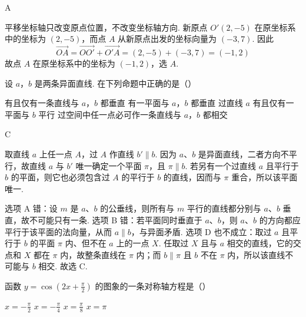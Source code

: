 \begin{answer}
A
\end{answer}

\begin{solution}
平移坐标轴只改变原点位置，不改变坐标轴方向. 新原点 \(O'(2,-5)\) 在原坐标系中的坐标为 \((2,-5)\)，而点 \(A\) 从新原点出发的坐标向量为 \((-3,7)\). 因此
\[
\overrightarrow{OA}=\overrightarrow{OO'}+\overrightarrow{O'A}=(2,-5)+(-3,7)=(-1,2)
\]
故点 \(A\) 在原坐标系中的坐标为 \((-1,2)\)，选 \(A\).
\end{solution}

\begin{problem}
设 \(a\)，\(b\) 是两条异面直线. 在下列命题中正确的是（\quad）

\choices
    {有且仅有一条直线与 \(a\)，\(b\) 都垂直}
    {有一平面与 \(a\)，\(b\) 都垂直}
    {过直线 \(a\) 有且仅有一平面与 \(b\) 平行}
    {过空间中任一点必可作一条直线与 \(a\)，\(b\) 都相交}
\end{problem}

\begin{answer}
C
\end{answer}

\begin{solution}
取直线 \(a\) 上任一点 \(A\)，过 \(A\) 作直线 \(b'\parallel b\). 因为 \(a\)、\(b\) 是异面直线，二者方向不平行，故直线 \(a\) 与 \(b'\) 唯一确定一个平面 \(\pi\)，且 \(\pi\parallel b\). 若另有一个过直线 \(a\) 且平行于 \(b\) 的平面，则它也必须包含过 \(A\) 的平行于 \(b\) 的直线，因而与 \(\pi\) 重合，所以该平面唯一.

选项 A 错：设 \(m\) 是 \(a\)、\(b\) 的公垂线，则所有与 \(m\) 平行的直线都分别与 \(a\)、\(b\) 垂直，故不可能只有一条. 选项 B 错：若平面同时垂直于 \(a\)、\(b\)，则 \(a\)、\(b\) 的方向都应平行于该平面的法向量，从而 \(a\parallel b\)，与异面矛盾. 选项 D 也不成立：取过 \(a\) 且平行于 \(b\) 的平面 \(\pi\) 内、但不在 \(a\) 上的一点 \(X\). 任取过 \(X\) 且与 \(a\) 相交的直线，它的交点和 \(X\) 都在 \(\pi\) 内，故整条直线在 \(\pi\) 内；而 \(b\parallel\pi\) 且 \(b\) 不在 \(\pi\) 内，所以该直线不可能与 \(b\) 相交. 故选 C.
\end{solution}

\begin{problem}
函数 \(y = \cos \left(2x + \frac{\pi}{2}\right) \) 的图象的一条对称轴方程是（\quad）

\choices
    {\(x = -\frac{\pi}{2}\)}
    {\(x = -\frac{\pi}{4}\)}
    {\(x = \frac{\pi}{8}\)}
    {\(x = \pi\)}
\end{problem}

